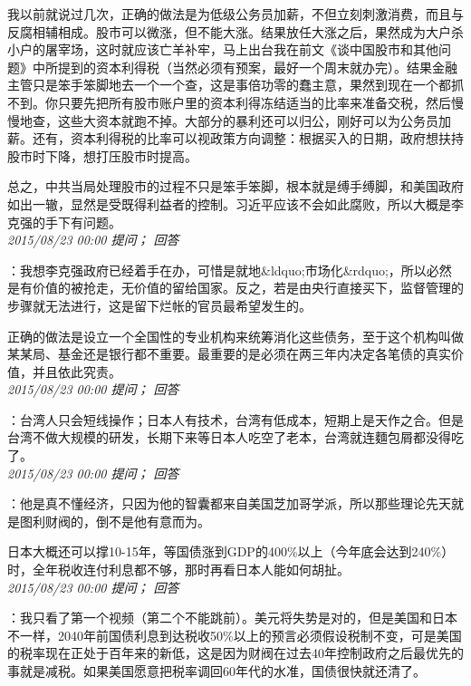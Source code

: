 \documentclass[twocolumn]{ctexart}
\begin{document}
我以前就说过几次，正确的做法是为低级公务员加薪，不但立刻刺激消费，而且与反腐相辅相成。股市可以微涨，但不能大涨。结果放任大涨之后，果然成为大户杀小户的屠宰场，这时就应该亡羊补牢，马上出台我在前文《谈中国股市和其他问题》中所提到的资本利得税（当然必须有预案，最好一个周末就办完）。结果金融主管只是笨手笨脚地去一个一个查，这是事倍功零的蠢主意，果然到现在一个都抓不到。你只要先把所有股市账户里的资本利得冻结适当的比率来准备交税，然后慢慢地查，这些大资本就跑不掉。大部分的暴利还可以归公，刚好可以为公务员加薪。还有，资本利得税的比率可以视政策方向调整：根据买入的日期，政府想扶持股市时下降，想打压股市时提高。

总之，中共当局处理股市的过程不只是笨手笨脚，根本就是缚手缚脚，和美国政府如出一辙，显然是受既得利益者的控制。习近平应该不会如此腐败，所以大概是李克强的手下有问题。\\

\textit{\hfill\noindent\small 2015/08/23 00:00 提问； 回答}

：我想李克强政府已经着手在办，可惜是就地\&ldquo;市场化\&rdquo;，所以必然是有价值的被抢走，无价值的留给国家。反之，若是由央行直接买下，监督管理的步骤就无法进行，这是留下烂帐的官员最希望发生的。

正确的做法是设立一个全国性的专业机构来统筹消化这些债务，至于这个机构叫做某某局、基金还是银行都不重要。最重要的是必须在两三年内决定各笔债的真实价值，并且依此究责。\\

\textit{\hfill\noindent\small 2015/08/23 00:00 提问； 回答}

：台湾人只会短线操作；日本人有技术，台湾有低成本，短期上是天作之合。但是台湾不做大规模的研发，长期下来等日本人吃空了老本，台湾就连麵包屑都没得吃了。\\

\textit{\hfill\noindent\small 2015/08/23 00:00 提问； 回答}

：他是真不懂经济，只因为他的智囊都来自美国芝加哥学派，所以那些理论先天就是图利财阀的，倒不是他有意而为。

日本大概还可以撑10-15年，等国债涨到GDP的400\%以上（今年底会达到240\%）时，全年税收连付利息都不够，那时再看日本人能如何胡扯。\\

\textit{\hfill\noindent\small 2015/08/23 00:00 提问； 回答}

：我只看了第一个视频（第二个不能跳前）。美元将失势是对的，但是美国和日本不一样，2040年前国债利息到达税收50\%以上的预言必须假设税制不变，可是美国的税率现在正处于百年来的新低，这是因为财阀在过去40年控制政府之后最优先的事就是减税。如果美国愿意把税率调回60年代的水准，国债很快就还清了。
\end{document}
